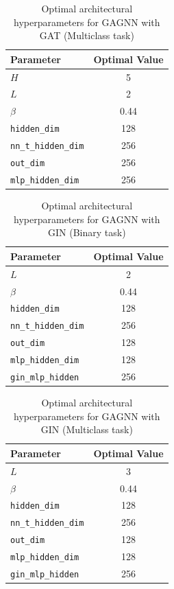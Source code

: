 \begin{table}
\centering
\begin{tabular}{l c}
\hline
\textbf{Parameter} & \textbf{Optimal Value} \\
\hline
$H$ & 5 \\
$L$ &  2 \\
$\beta$ &  0.44\\
\texttt{hidden\_dim} & 128 \\
\texttt{nn\_t\_hidden\_dim} & 256  \\
\texttt{out\_dim} &  256 \\
\texttt{mlp\_hidden\_dim} & 256 \\
\hline
\end{tabular}
\caption{Optimal architectural hyperparameters for GAGNN with GAT (Multiclass task)}
\label{tab:res_phase2_gagnn_gat_multi}
\end{table}

\begin{table}
\centering
\begin{tabular}{l c}
\hline
\textbf{Parameter} & \textbf{Optimal Value} \\
\hline
$L$ & 2 \\
$\beta$ & 0.44  \\
\texttt{hidden\_dim} & 128 \\
\texttt{nn\_t\_hidden\_dim} & 256 \\
\texttt{out\_dim} & 128 \\
\texttt{mlp\_hidden\_dim} & 128 \\
\texttt{gin\_mlp\_hidden} & 256 \\
\hline
\end{tabular}
\caption{Optimal architectural hyperparameters for GAGNN with GIN (Binary task)}
\label{tab:res_phase2_gagnn_gin_bin}
\end{table}

\begin{table}
\centering
\begin{tabular}{l c}
\hline
\textbf{Parameter} & \textbf{Optimal Value} \\
\hline
$L$ & 3 \\
$\beta$ & 0.44  \\
\texttt{hidden\_dim} & 128 \\
\texttt{nn\_t\_hidden\_dim} & 256 \\
\texttt{out\_dim} & 128 \\
\texttt{mlp\_hidden\_dim} & 128 \\
\texttt{gin\_mlp\_hidden} & 256 \\
\hline
\end{tabular}
\caption{Optimal architectural hyperparameters for GAGNN with GIN (Multiclass task)}
\label{tab:res_phase2_gagnn_gin_multi}
\end{table}

